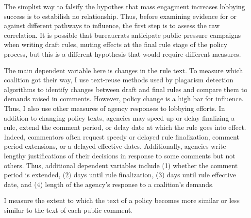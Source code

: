 The simplist way to falsify the hypothes that mass engagment increases lobbying success is to estabilish no relationship. Thus, before examining evidence for or against different pathways to influence, the first step is to assess the raw correlation. It is possible that bureaucrats anticipate public pressure campaigns when writing draft rules, muting effects at the final rule stage of the policy process, but this is a different hypothesis that would require different measures.  

The main dependent variable here is changes in the rule text. To measure which coalition got their way, I use text-reuse methods used by plagarism detection algorithms to identify changes between draft and final rules and compare them to demands raised in comments.
However, policy change is a high bar for influence. Thus, I also use other measures of agency responses to lobbying efforts. 
In addition to changing policy texts, agencies may speed up or delay finalizing a rule, extend the comment period, or delay date at which the rule goes into effect. Indeed, commentors often request speedy or delayed rule finalization, comment period extensions, or a delayed effective dates. Additionally, agencies write lengthy justifications of their decisions in response to some comments but not others. Thus, additional dependent variables include (1) whether the comment period is extended, (2) days until rule finalization, (3) days until rule effective date, and (4) length of the agency's response to a coalition's demands. 




I measure the extent to which the text of a policy becomes more similar or less similar to the text of each public comment. 


